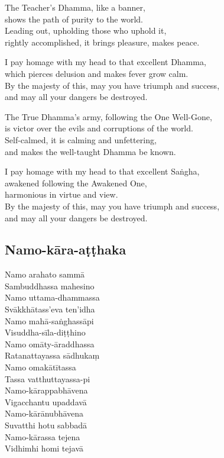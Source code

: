 The Teacher's Dhamma, like a banner,\\
shows the path of purity to the world.\\
Leading out, upholding those who uphold it,\\
rightly accomplished, it brings pleasure, makes peace.

I pay homage with my head to that excellent Dhamma,\\
which pierces delusion and makes fever grow calm.\\
By the majesty of this, may you have triumph and success,\\
and may all your dangers be destroyed.

The True Dhamma's army, following the One Well-Gone,\\
is victor over the evils and corruptions of the world.\\
Self-calmed, it is calming and unfettering,\\
and makes the well-taught Dhamma be known.

I pay homage with my head to that excellent Saṅgha,\\
awakened following the Awakened One,\\\vin harmonious in virtue and view.\\
By the majesty of this, may you have triumph and success,\\
and may all your dangers be destroyed.

\subsection{Namo-kāra-aṭṭhaka}
\label{namo-arahato}


\begin{paritta}
  Namo arahato sammā\\
  Sambuddhassa mahesino\\
  Namo uttama-dhammassa\\
  Svākkhātass'eva ten'idha\\
  Namo mahā-saṅghassāpi\\
  Visuddha-sīla-diṭṭhino\\
  Namo omāty-āraddhassa\\
  Ratanattayassa sādhukaṃ\\
  Namo omakātītassa\\
  Tassa vatthuttayassa-pi\\
  Namo-kārappabhāvena\\
  Vigacchantu upaddavā\\
  Namo-kārānubhāvena\\
  Suvatthi hotu sabbadā\\
  Namo-kārassa tejena\\
  Vidhimhi homi tejavā
\end{paritta}

